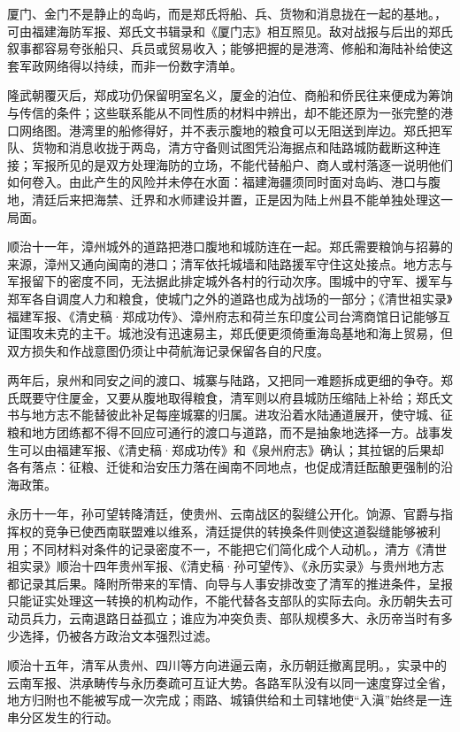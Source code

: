 厦门、金门不是静止的岛屿，而是郑氏将船、兵、货物和消息拢在一起的基地。，可由福建海防军报、郑氏文书辑录和《厦门志》相互照见。敌对战报与后出的郑氏叙事都容易夸张船只、兵员或贸易收入；能够把握的是港湾、修船和海陆补给使这套军政网络得以持续，而非一份数字清单。

隆武朝覆灭后，郑成功仍保留明室名义，厦金的泊位、商船和侨民往来便成为筹饷与传信的条件；这些联系能从不同性质的材料中辨出，却不能还原为一张完整的港口网络图。港湾里的船修得好，并不表示腹地的粮食可以无阻送到岸边。郑氏把军队、货物和消息收拢于两岛，清方守备则试图凭沿海据点和陆路城防截断这种连接；军报所见的是双方处理海防的立场，不能代替船户、商人或村落逐一说明他们如何卷入。由此产生的风险并未停在水面：福建海疆须同时面对岛屿、港口与腹地，清廷后来把海禁、迁界和水师建设并置，正是因为陆上州县不能单独处理这一局面。

顺治十一年，漳州城外的道路把港口腹地和城防连在一起。郑氏需要粮饷与招募的来源，漳州又通向闽南的港口；清军依托城墙和陆路援军守住这处接点。地方志与军报留下的密度不同，无法据此排定城外各村的行动次序。围城中的守军、援军与郑军各自调度人力和粮食，使城门之外的道路也成为战场的一部分；《清世祖实录》福建军报、《清史稿·郑成功传》、漳州府志和荷兰东印度公司台湾商馆日记能够互证围攻未克的主干。城池没有迅速易主，郑氏便更须倚重海岛基地和海上贸易，但双方损失和作战意图仍须让中荷航海记录保留各自的尺度。

两年后，泉州和同安之间的渡口、城寨与陆路，又把同一难题拆成更细的争夺。郑氏既要守住厦金，又要从腹地取得粮食，清军则以府县城防压缩陆上补给；郑氏文书与地方志不能替彼此补足每座城寨的归属。进攻沿着水陆通道展开，使守城、征粮和地方团练都不得不回应可通行的渡口与道路，而不是抽象地选择一方。战事发生可以由福建军报、《清史稿·郑成功传》和《泉州府志》确认；其拉锯的后果却各有落点：征粮、迁徙和治安压力落在闽南不同地点，也促成清廷酝酿更强制的沿海政策。

永历十一年，孙可望转降清廷，使贵州、云南战区的裂缝公开化。饷源、官爵与指挥权的竞争已使西南联盟难以维系，清廷提供的转换条件则使这道裂缝能够被利用；不同材料对条件的记录密度不一，不能把它们简化成个人动机。，清方《清世祖实录》顺治十四年贵州军报、《清史稿·孙可望传》、《永历实录》与贵州地方志都记录其后果。降附所带来的军情、向导与人事安排改变了清军的推进条件，呈报只能证实处理这一转换的机构动作，不能代替各支部队的实际去向。永历朝失去可动员兵力，云南退路日益孤立；谁应为冲突负责、部队规模多大、永历帝当时有多少选择，仍被各方政治文本强烈过滤。

顺治十五年，清军从贵州、四川等方向进逼云南，永历朝廷撤离昆明。，实录中的云南军报、洪承畴传与永历奏疏可互证大势。各路军队没有以同一速度穿过全省，地方归附也不能被写成一次完成；雨路、城镇供给和土司辖地使“入滇”始终是一连串分区发生的行动。

